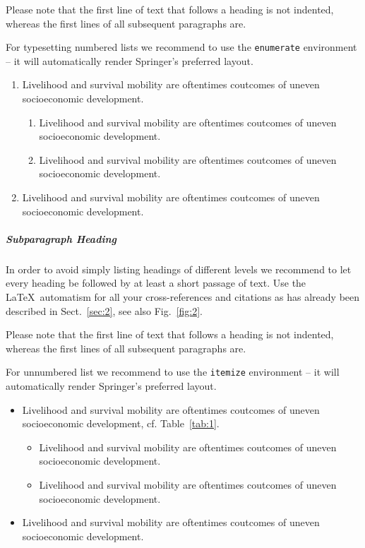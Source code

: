 Please note that the first line of text that follows a heading is not indented, whereas the first lines of all subsequent paragraphs are.

For typesetting numbered lists we recommend to use the \verb|enumerate| environment -- it will automatically render Springer's preferred layout.

\begin{enumerate}
\item{Livelihood and survival mobility are oftentimes coutcomes of uneven socioeconomic development.}
\begin{enumerate}
\item{Livelihood and survival mobility are oftentimes coutcomes of uneven socioeconomic development.}
\item{Livelihood and survival mobility are oftentimes coutcomes of uneven socioeconomic development.}
\end{enumerate}
\item{Livelihood and survival mobility are oftentimes coutcomes of uneven socioeconomic development.}
\end{enumerate}


\subparagraph{Subparagraph Heading} In order to avoid simply listing headings of different levels we recommend to let every heading be followed by at least a short passage of text. Use the \LaTeX\ automatism for all your cross-references and citations as has already been described in Sect.~\ref{sec:2}, see also Fig.~\ref{fig:2}.

Please note that the first line of text that follows a heading is not indented, whereas the first lines of all subsequent paragraphs are.

For unnumbered list we recommend to use the \verb|itemize| environment -- it will automatically render Springer's preferred layout.

\begin{itemize}
\item{Livelihood and survival mobility are oftentimes coutcomes of uneven socioeconomic development, cf. Table~\ref{tab:1}.}
\begin{itemize}
\item{Livelihood and survival mobility are oftentimes coutcomes of uneven socioeconomic development.}
\item{Livelihood and survival mobility are oftentimes coutcomes of uneven socioeconomic development.}
\end{itemize}
\item{Livelihood and survival mobility are oftentimes coutcomes of uneven socioeconomic development.}
\end{itemize}

